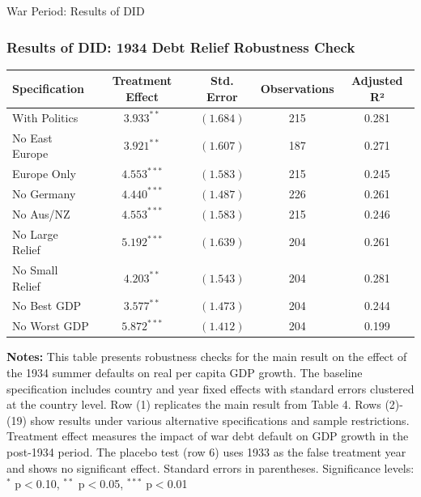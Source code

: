 \documentclass{beamer}
\begin{document}
\begin{frame}{War Period: Results of DID}
  \frametitle{Results of DID: 1934 Debt Relief Robustness Check}
  \begin{table}[ht!]\centering
      \renewcommand{\arraystretch}{1.1}
      \footnotesize
      \begin{tabular}{@{}p{2.2cm}cccc@{}}
    \toprule
    \textbf{Specification} & \textbf{Treatment Effect} & \textbf{Std. Error} & \textbf{Observations} & \textbf{Adjusted R²} \\
    \midrule
    With Politics & $3.933^{**}$ & $(1.684)$ & 215 & 0.281 \\
    No East Europe & $3.921^{**}$ & $(1.607)$ & 187 & 0.271 \\
    Europe Only & $4.553^{***}$ & $(1.583)$ & 215 & 0.245 \\
    No Germany & $4.440^{***}$ & $(1.487)$ & 226 & 0.261 \\
    No Aus/NZ & $4.553^{***}$ & $(1.583)$ & 215 & 0.246 \\
    No Large Relief & $5.192^{***}$ & $(1.639)$ & 204 & 0.261 \\
    No Small Relief & $4.203^{**}$ & $(1.543)$ & 204 & 0.281 \\
    No Best GDP & $3.577^{**}$ & $(1.473)$ & 204 & 0.244 \\
    No Worst GDP & $5.872^{***}$ & $(1.412)$ & 204 & 0.199 \\
    \bottomrule
    \end{tabular}
    \begin{minipage}{\textwidth}
    \footnotesize
    \textbf{Notes:} This table presents robustness checks for the main result on the effect of the 1934 summer defaults on real per capita GDP growth. The baseline specification includes country and year fixed effects with standard errors clustered at the country level. Row (1) replicates the main result from Table 4. Rows (2)-(19) show results under various alternative specifications and sample restrictions. Treatment effect measures the impact of war debt default on GDP growth in the post-1934 period. The placebo test (row 6) uses 1933 as the false treatment year and shows no significant effect. Standard errors in parentheses. Significance levels: $^*$ p$<$0.10, $^{**}$ p$<$0.05, $^{***}$ p$<$0.01
    \end{minipage}
    \end{table}
\end{frame}
\end{document}
